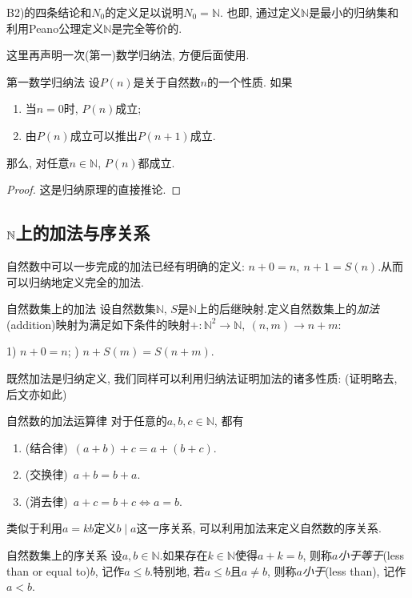 B2)的四条结论和$N_0$的定义足以说明$N_0=\mathbb{N}$. 也即, 通过定义$\mathbb{N}$是最小的归纳集和利用Peano公理定义$\mathbb{N}$是完全等价的.

这里再声明一次(第一)数学归纳法, 方便后面使用.

\begin{theorem}{第一数学归纳法} \label{thm:diyigvna}
	设$P(n)$是关于自然数$n$的一个性质. 如果
	\begin{enumerate}
		\item 当$n=0$时, $P(n)$成立; 
		\item 由$P(n)$成立可以推出$P(n+1)$成立.
	\end{enumerate}
	那么, 对任意$n \in \mathbb{N}$, $P(n)$都成立.
\end{theorem}
\begin{proof}
	这是归纳原理的直接推论. 
\end{proof}

\subsection{$\mathbb{N}$上的加法与序关系}

自然数中可以一步完成的加法已经有明确的定义: $n+0=n, ~n+1=S(n)$.从而可以归纳地定义完全的加法.

\begin{definition}{自然数集上的加法}
	设自然数集$\mathbb{N}$, $S$是$\mathbb{N}$上的后继映射.定义自然数集上的\textit{加法}(addition)映射为满足如下条件的映射$+: \mathbb{N}^2 \to \mathbb{N}, ~(n, m) \to n+m$: 
	
	1) $n+0=n$; ) $n+S(m)=S(n+m)$. 
\end{definition}

既然加法是归纳定义, 我们同样可以利用归纳法证明加法的诸多性质: (证明略去, 后文亦如此)

\begin{proposition}{自然数的加法运算律}
	对于任意的$a, b, c \in \mathbb{N}$, 都有
	\begin{enumerate}
		\item (结合律)~$(a+b)+c = a+(b+c)$.
		\item (交换律)~$a+b=b+a$.
		\item (消去律)~$a+c=b+c \Leftrightarrow a=b$.
	\end{enumerate}
\end{proposition}

类似于利用$a=kb$定义$b \mid a$这一序关系, 可以利用加法来定义自然数的序关系.

\begin{definition}{自然数集上的序关系}
	设$a, b \in \mathbb{N}$.如果存在$k \in \mathbb{N}$使得$a+k=b$, 则称$a$\textit{小于等于}(less than or equal to)$b$, 记作$a \leq b$.特别地, 若$a \leq b$且$a \neq b$, 则称$a$\textit{小于}(less than), 记作$a<b$.
\end{definition}

